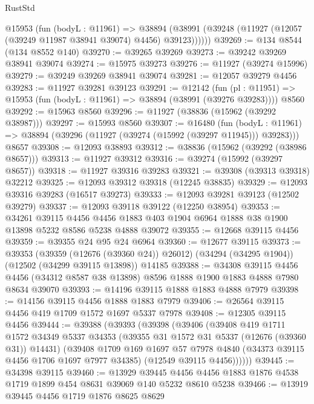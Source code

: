\begin{lexlean}{RustStd}
\begin{coremodule}
      @15953
        (fun (bodyL : @11961) =>
        @38894 (@38991 (@39248 (@11927 (@12057 (@39249 @11987 @38941 @39074) @4456) @39123))))))
@39269 := @134 @8544 (@134 @8552 @140)
@39270 := @39265 @39269
@39273 := @39242 @39269 @38941 @39074
@39274 := @15975 @39273
@39276 := @11927 (@39274 @15996)
@39279 := @39249 @39269 @38941 @39074
@39281 := @12057 @39279 @4456
@39283 := @11927 @39281 @39123
@39291 := @12142
    (fun (pl : @11951) => @15953 (fun (bodyL : @11961) => @38894 (@38991 (@39276 @39283))))
    @8560
@39292 := @15963 @8560
@39296 := @11927 (@38836 (@15962 (@39292 @38987)))
@39297 := @15993 @8560
@39307 := @16480
    (fun (bodyL : @11961) => @38894 (@39296 (@11927 (@39274 (@15992 (@39297 @11945))) @39283)))
    @8657
@39308 := @12093 @38893
@39312 := @38836 (@15962 (@39292 (@38986 @8657)))
@39313 := @11927 @39312
@39316 := @39274 (@15992 (@39297 @8657))
@39318 := @11927 @39316 @39283
@39321 := @39308 (@39313 @39318) @32212
@39325 := @12093 @39312 @39318 (@12245 @38835)
@39329 := @12093 @39316 @39283 (@16517 @39273)
@39333 := @12093 @39281 @39123 (@12502 @39279)
@39337 := @12093 @39118 @39122 (@12250 @38954)
@39353 := @34261
    @39115
    @4456
    @4456
    @1883
    @403
    @1904
    @6964
    @1888
    @38
    @1900
    @13898
    @5232
    @8586
    @5238
    @4888
    @39072
@39355 := @12668 @39115 @4456
@39359 := @39355 @24 @95 @24 @6964
@39360 := @12677 @39115
@39373 := @39353
    (@39359 (@12676 (@39360 @24)) @26012)
    (@34294 (@34295 @1904))
    (@12502 (@34299 @39115 @13898))
    @14185
@39388 := @34308
    @39115
    @4456
    @4456
    (@34312 @8587 @38 @13898)
    @8596
    @1888
    @1900
    @1883
    @4888
    @7980
    @8634
    @39070
@39393 := @14196 @39115 @1888 @1883 @4888 @7979
@39398 := @14156 @39115 @4456 @1888 @1883 @7979
@39406 := @26564 @39115 @4456 @419 @1709 @1572 @1697 @5337 @7978
@39408 := @12305 @39115 @4456
@39444 := @39388
    (@39393
      (@39398
        (@39406
          (@39408
            @419
            @1711
            @1572
            @34349
            @5337
            @34353
            (@39355 @31 @1572 @31 @5337 (@12676 (@39360 @31)) @14431)
            (@39408
              @1709
              @169
              @1697
              @57
              @7978
              @4840
              (@34373 @39115 @4456 @1706 @1697 @7977 @34385)
              (@12549 @39115 @4456))))))
@39445 := @34398 @39115
@39460 := @13929
    @39445
    @4456
    @4456
    @1883
    @1876
    @4538
    @1719
    @1899
    @454
    @8631
    @39069
    @140
    @5232
    @8610
    @5238
@39466 := @13919 @39445 @4456 @1719 @1876 @8625 @8629

\end{coremodule}
\end{lexlean}
